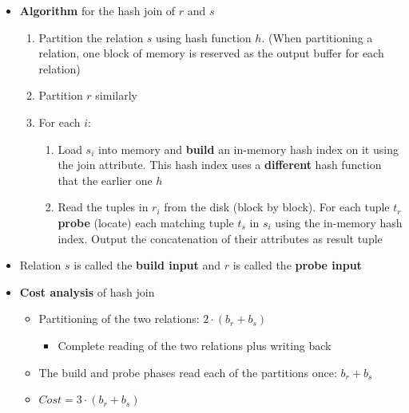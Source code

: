 \begin{itemize}[label=\(\rhd\)]
    \item \textbf{Algorithm} for the hash join of $r$ and $s$
    \begin{enumerate}
        \item Partition the relation $s$ using hash function $h$. (When partitioning a relation, one block of memory is reserved as the output buffer for each relation)
        \item Partition $r$ similarly
        \item For each $i$:
        \begin{enumerate}[label*=\arabic*.] 
            \item Load $s_i$ into memory and \textbf{build} an in-memory hash index on it using the join attribute. This hash index uses a \textbf{different} hash function that the earlier one $h$
            \item Read the tuples in $r_i$ from the disk (block by block). For each tuple $t_r$ \textbf{probe} (locate) each matching tuple $t_s$ in $s_i$ using the in-memory hash index. Output the concatenation of their attributes as result tuple
        \end{enumerate}
    \end{enumerate}
    \item Relation $s$ is called the \textbf{build input} and $r$ is called the \textbf{probe input}
    \item \textbf{Cost analysis} of hash join
    \begin{itemize}[label=\(\rhd\)]
        \item Partitioning of the two relations: $2\cdot (b_r+b_s)$
        \begin{itemize}[label=\(\rhd\)]
            \item Complete reading of the two relations plus writing back
        \end{itemize}
        \item The build and probe phases read each of the partitions once: $b_r+b_s$
        \item $Cost=3\cdot(b_r+b_s)$
    \end{itemize}
\end{itemize}

